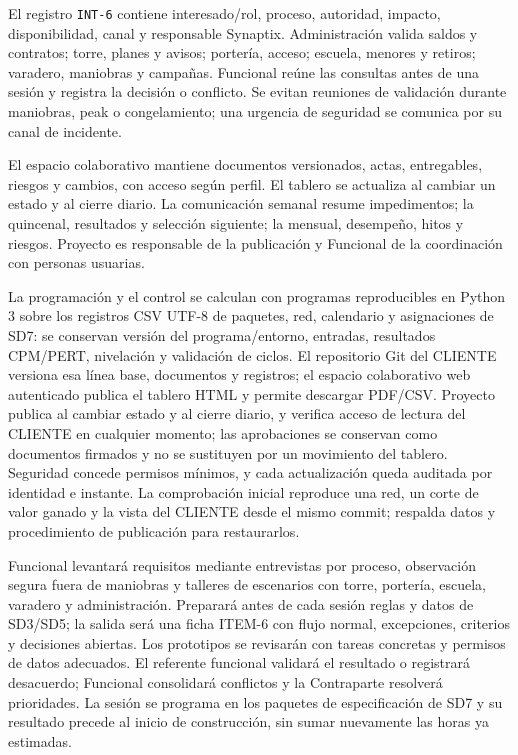El registro \texttt{INT-6} contiene interesado/rol, proceso, autoridad, impacto, disponibilidad, canal y responsable Synaptix. Administración valida saldos y contratos; torre, planes y avisos; portería, acceso; escuela, menores y retiros; varadero, maniobras y campañas. Funcional reúne las consultas antes de una sesión y registra la decisión o conflicto. Se evitan reuniones de validación durante maniobras, peak o congelamiento; una urgencia de seguridad se comunica por su canal de incidente. \parencite[numerales 13.1--13.3, pp.~28--30]{sd6-c07}

El espacio colaborativo mantiene documentos versionados, actas, entregables, riesgos y cambios, con acceso según perfil. El tablero se actualiza al cambiar un estado y al cierre diario. La comunicación semanal resume impedimentos; la quincenal, resultados y selección siguiente; la mensual, desempeño, hitos y riesgos. Proyecto es responsable de la publicación y Funcional de la coordinación con personas usuarias. \parencite[RT-19.05/06/08, pp.~33--34]{sd6-bt}

La programación y el control se calculan con programas reproducibles en Python 3 sobre los registros CSV UTF-8 de paquetes, red, calendario y asignaciones de SD7: se conservan versión del programa/entorno, entradas, resultados CPM/PERT, nivelación y validación de ciclos. El repositorio Git del CLIENTE versiona esa línea base, documentos y registros; el espacio colaborativo web autenticado publica el tablero HTML y permite descargar PDF/CSV. Proyecto publica al cambiar estado y al cierre diario, y verifica acceso de lectura del CLIENTE en cualquier momento; las aprobaciones se conservan como documentos firmados y no se sustituyen por un movimiento del tablero. Seguridad concede permisos mínimos, y cada actualización queda auditada por identidad e instante. La comprobación inicial reproduce una red, un corte de valor ganado y la vista del CLIENTE desde el mismo commit; respalda datos y procedimiento de publicación para restaurarlos. \parencites[Formulario T-7, Subdocumento 6, p.~58]{sd6-ba}[RT-19.05/08, pp.~33--34]{sd6-bt}

Funcional levantará requisitos mediante entrevistas por proceso, observación segura fuera de maniobras y talleres de escenarios con torre, portería, escuela, varadero y administración. Preparará antes de cada sesión reglas y datos de SD3/SD5; la salida será una ficha ITEM-6 con flujo normal, excepciones, criterios y decisiones abiertas. Los prototipos se revisarán con tareas concretas y permisos de datos adecuados. El referente funcional validará el resultado o registrará desacuerdo; Funcional consolidará conflictos y la Contraparte resolverá prioridades. La sesión se programa en los paquetes de especificación de SD7 y su resultado precede al inicio de construcción, sin sumar nuevamente las horas ya estimadas.

